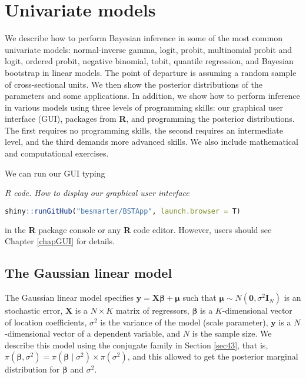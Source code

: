\chapter{Univariate models}\label{chap6}

We describe how to perform Bayesian inference in some of the most common univariate models: normal-inverse gamma, logit, probit, multinomial probit and logit, ordered probit, negative binomial, tobit, quantile regression, and Bayesian bootstrap in linear models. The point of departure is assuming a random sample of cross-sectional units. We then show the posterior distributions of the parameters and some applications. In addition, we show how to perform inference in various models using three levels of programming skills: our graphical user interface (GUI), packages from \textbf{R}, and programming the posterior distributions. The first requires no programming skills, the second requires an intermediate level, and the third demands more advanced skills. We also include mathematical and computational exercises.

We can run our GUI typing

\begin{tcolorbox}[enhanced,width=4.67in,center upper,
	fontupper=\large\bfseries,drop shadow southwest,sharp corners]
	\textit{R code. How to display our graphical user interface}
	\begin{VF}
		\begin{lstlisting}[language=R]
	shiny::runGitHub("besmarter/BSTApp", launch.browser = T)
\end{lstlisting}
	\end{VF}
\end{tcolorbox} 

in the \textbf{R} package console or any \textbf{R} code editor. However, users should see Chapter \ref{chapGUI} for details.

\section{The Gaussian linear model}\label{sec61}

The Gaussian linear model specifies ${\bm{y}}={\bm{X}}\bm{\bm{\beta}}+\bm{\mu}$ such that $\bm{\mu}\sim N(\bm{0},\sigma^2\bm{I}_N)$ is an stochastic error, ${\bm{X}}$ is a $N \times K$ matrix of regressors, $\bm{\bm{\beta}}$ is a $K$-dimensional vector of location coefficients, $\sigma^2$ is the variance of the model (scale parameter), ${\bm{y}}$ is a $N$-dimensional vector of a dependent variable, and $N$ is the sample size. We describe this model using the conjugate family in Section \ref{sec43}, that is, $\pi(\bm{\bm{\beta}},\sigma^2)=\pi(\bm{\bm{\beta}}\mid \sigma^2)\times\pi(\sigma^2)$, and this allowed to get the posterior marginal distribution for $\bm{\bm{\beta}}$ and $\sigma^2$.

